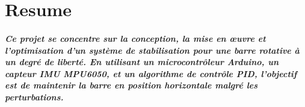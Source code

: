 \thispagestyle{plain} %
\chapter*{Resume} %
\paragraph*{Ce projet se concentre sur la conception, la mise en œuvre et l'optimisation d'un système de stabilisation pour une barre rotative à un degré de liberté. En utilisant un microcontrôleur Arduino, un capteur IMU MPU6050, et un algorithme de contrôle PID, l'objectif est de maintenir la barre en position horizontale malgré les perturbations.}
\blankpage
